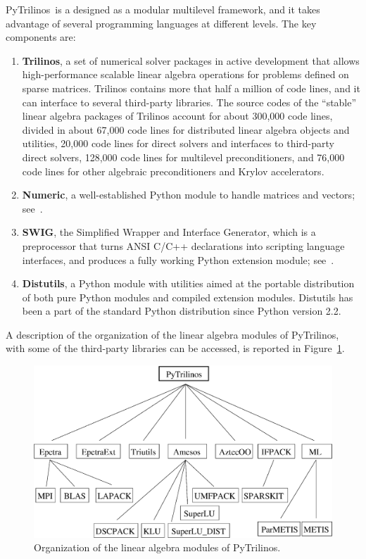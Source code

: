 \documentclass[10pt,relax]{SANDreport}
\newcommand{\PyTrilinos}{{PyTrilinos}}
\begin{document}
  
\PyTrilinos\ is a designed as a modular multilevel framework, and it
takes advantage of several programming languages at different levels.
The key components are:
\begin{enumerate}

\item {\bf Trilinos}, a set of numerical solver packages in active
  development that allows high-performance scalable linear algebra
  operations for problems defined on sparse matrices. Trilinos
  contains more that half a million of code lines, and it can
  interface to several third-party libraries. The source codes of the
  ``stable'' linear algebra packages of Trilinos account for about 300,000
  code lines, divided in about 67,000 code lines for distributed linear
  algebra objects and utilities, 20,000 code lines for direct solvers and
  interfaces to third-party direct solvers, 128,000 code lines for multilevel
  preconditioners, and 76,000 code lines for other algebraic preconditioners
  and Krylov accelerators.

\item {\bf Numeric}, a well-established Python module to handle
  matrices and vectors; see~\cite{numeric}.

\item {\bf SWIG}, the Simplified Wrapper and Interface Generator,
  which is a preprocessor that turns ANSI C/C++ declarations into
  scripting language interfaces, and produces a fully working Python
  extension module; see~\cite{swig}.

\item {\bf Distutils}, a Python module with utilities aimed at the
  portable distribution of both pure Python modules and compiled
  extension modules.  Distutils has been a part of the standard Python
  distribution since Python version 2.2.

\end{enumerate}

A description of the organization of  the linear algebra modules of
PyTrilinos, with some of the third-party libraries can be accessed,
is reported in Figure~\ref{fig:organization}.

\begin{figure}
\begin{center}
\includegraphics[width=12cm]{../UsersGuide/organization.eps}
\caption{Organization of the linear algebra modules of PyTrilinos.}
\label{fig:organization}
\end{center}
\end{figure}
\end{document}
